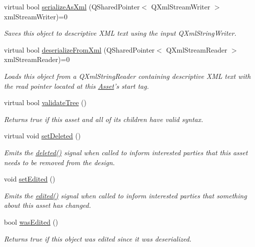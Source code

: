 \begin{DoxyCompactItemize}
virtual bool \hyperlink{class_picto_1_1_asset_a3ecc27a886c700438d98187e030d203f}{serialize\-As\-Xml} (Q\-Shared\-Pointer$<$ Q\-Xml\-Stream\-Writer $>$ xml\-Stream\-Writer)=0
\begin{DoxyCompactList}\small\item\em Saves this object to descriptive X\-M\-L text using the input Q\-Xml\-String\-Writer. \end{DoxyCompactList}\item 
virtual bool \hyperlink{class_picto_1_1_asset_a45e33e9da0d81734ec9e50a02ac325be}{deserialize\-From\-Xml} (Q\-Shared\-Pointer$<$ Q\-Xml\-Stream\-Reader $>$ xml\-Stream\-Reader)=0
\begin{DoxyCompactList}\small\item\em Loads this object from a Q\-Xml\-String\-Reader containing descriptive X\-M\-L text with the read pointer located at this \hyperlink{class_picto_1_1_asset}{Asset}'s start tag. \end{DoxyCompactList}\item 
virtual bool \hyperlink{class_picto_1_1_asset_a348f19144d26a035faebd628734038dd}{validate\-Tree} ()
\begin{DoxyCompactList}\small\item\em Returns true if this asset and all of its children have valid syntax. \end{DoxyCompactList}\item 
virtual void \hyperlink{class_picto_1_1_asset_a18d0b5155b57ca24254afde1dfb765cd}{set\-Deleted} ()
\begin{DoxyCompactList}\small\item\em Emits the \hyperlink{class_picto_1_1_asset_a5a96aa71c14a5de4a24aea183660147a}{deleted()} signal when called to inform interested parties that this asset needs to be removed from the design. \end{DoxyCompactList}\item 
void \hyperlink{class_picto_1_1_asset_a3463b8bd3c8b62837c0fcf4ceee533dc}{set\-Edited} ()
\begin{DoxyCompactList}\small\item\em Emits the \hyperlink{class_picto_1_1_asset_a2ca6303bf64730a9994a180bf2227da4}{edited()} signal when called to inform interested parties that something about this asset has changed. \end{DoxyCompactList}\item 
bool \hyperlink{class_picto_1_1_asset_a0937b75a65094505ea69b00be1aaab7b}{was\-Edited} ()
\begin{DoxyCompactList}\small\item\em Returns true if this object was edited since it was deserialized. \end{DoxyCompactList}\item 

\end{DoxyCompactItemize}
